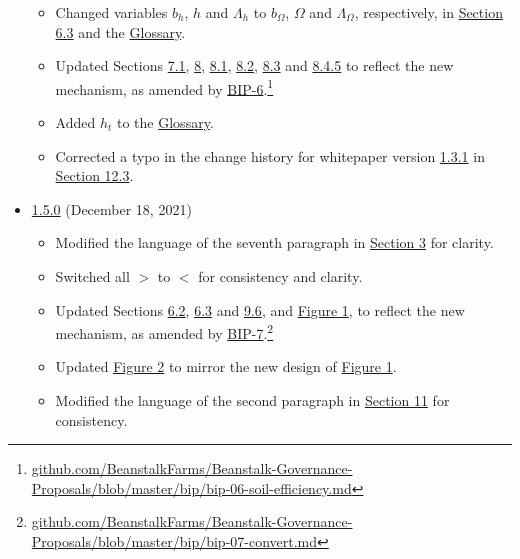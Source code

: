 \documentclass[class=article, crop=false]{standalone}
\begin{document}
\begin{itemize}[topsep=0pt, itemsep=3pt,leftmargin=16pt]
\begin{itemize}
        \item Changed variables $b_h$, $h$ and $\Lambda_h$ to $b_{\Omega}$, $\Omega$ and $\Lambda_{\Omega}$, respectively, in \hyperlink{subsection.6.3}{Section 6.3} and the \hyperlink{subsection.14.11}{Glossary}.
        \item Updated Sections \hyperlink{subsection.7.1}{7.1}, \hyperlink{section.8}{8}, \hyperlink{subsection.8.1}{8.1}, \hyperlink{subsection.8.2}{8.2}, \hyperlink{subsection.8.3}{8.3} and \hyperlink{subsubsection.8.4.5}{8.4.5} to reflect the new  mechanism, as amended by \href{https://github.com/BeanstalkFarms/Beanstalk-Governance-Proposals/blob/master/bip/bip-06-soil-efficiency.md}{BIP-6}.\footnote{\href{https://github.com/BeanstalkFarms/Beanstalk-Governance-Proposals/blob/master/bip/bip-06-soil-efficiency.md}{github.com/BeanstalkFarms/Beanstalk-Governance-Proposals/blob/master/bip/bip-06-soil-efficiency.md}}
        \item Added $h_t$ to the \hyperlink{subsection.14.11}{Glossary}. 
        \item Corrected a typo in the change history for whitepaper version \href{https://github.com/BeanstalkFarms/Beanstalk/blob/master/version-history/beanstalk1_3_1.pdf}{1.3.1} in \hyperlink{subsection.12.3}{Section 12.3}.
    \end{itemize}
    \item \href{https://github.com/BeanstalkFarms/Beanstalk/blob/master/version-history/beanstalk1_5_0.pdf}{1.5.0} (December 18, 2021)
    \begin{itemize}
        \item Modified the language of the seventh paragraph in \hyperlink{section.6.3}{Section 3} for clarity.
        \item Switched all $>$ to $<$ for consistency and clarity.
        \item Updated Sections \hyperlink{subsection.6.2}{6.2}, \hyperlink{subsection.6.3}{6.3} and \hyperlink{subsection.9.6}{9.6}, and \hyperref[fig 1]{Figure 1}, to reflect the new  mechanism, as amended by \href{https://github.com/BeanstalkFarms/Beanstalk-Governance-Proposals/blob/master/bip/bip-07-convert.md}{BIP-7}.\footnote{\href{https://github.com/BeanstalkFarms/Beanstalk-Governance-Proposals/blob/master/bip/bip-07-convert.md}{github.com/BeanstalkFarms/Beanstalk-Governance-Proposals/blob/master/bip/bip-07-convert.md}}
        \item Updated \hyperref[fig 2]{Figure 2} to mirror the new design of \hyperref[fig 1]{Figure 1}. 
        \item Modified the language of the second paragraph in \hyperlink{section.11}{Section 11} for consistency.

\end{itemize}
\end{itemize}
\end{document}

